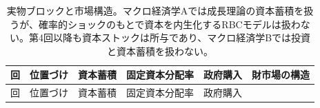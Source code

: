 \documentclass[
  japanese,
  lualatex,
  ja=standard,
  12pt,
  a4paper]{ltjsarticle}
\begin{document}
\begin{longtable}[]{@{}
  >{\raggedleft\arraybackslash}p{}
  >{\raggedright\arraybackslash}p{}
  >{\raggedright\arraybackslash}p{}
  >{\raggedright\arraybackslash}p{}
  >{\raggedright\arraybackslash}p{}
  >{\raggedright\arraybackslash}p{}@{}}
\caption{実物ブロックと市場構造。マクロ経済学Aでは成長理論の資本蓄積を扱うが、確率的ショックのもとで資本を内生化するRBCモデルは扱わない。第4回以降も資本ストックは所与であり、マクロ経済学Bでは投資と資本蓄積を扱わない。}\label{tbl-assumption-real}\tabularnewline
\toprule\noalign{}
\begin{minipage}[b]{\linewidth}\raggedleft
回
\end{minipage} & \begin{minipage}[b]{\linewidth}\raggedright
位置づけ
\end{minipage} & \begin{minipage}[b]{\linewidth}\raggedright
資本蓄積
\end{minipage} & \begin{minipage}[b]{\linewidth}\raggedright
固定資本分配率
\end{minipage} & \begin{minipage}[b]{\linewidth}\raggedright
政府購入
\end{minipage} & \begin{minipage}[b]{\linewidth}\raggedright
財市場の構造
\end{minipage} \\
\midrule\noalign{}
\endfirsthead
\toprule\noalign{}
\begin{minipage}[b]{\linewidth}\raggedleft
回
\end{minipage} & \begin{minipage}[b]{\linewidth}\raggedright
位置づけ
\end{minipage} & \begin{minipage}[b]{\linewidth}\raggedright
資本蓄積
\end{minipage} & \begin{minipage}[b]{\linewidth}\raggedright
固定資本分配率
\end{minipage} & \begin{minipage}[b]{\linewidth}\raggedright
政府購入
\end{minipage} & \begin{minipage}[b]{\linewidth}\raggedright

\end{minipage}
\end{longtable}
\end{document}
